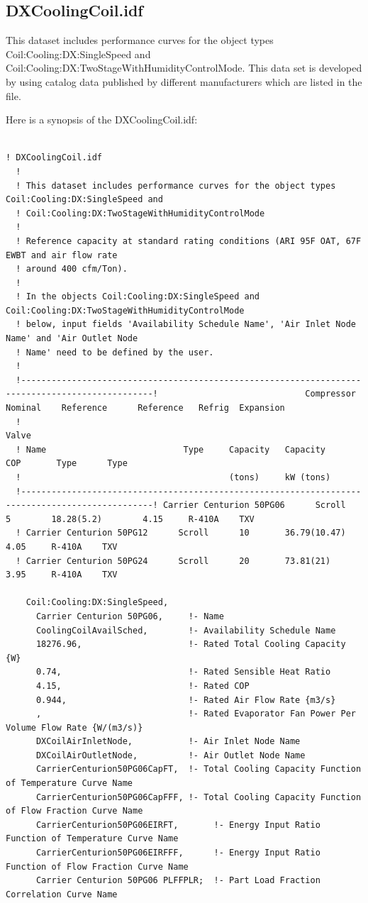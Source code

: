 \subsection{DXCoolingCoil.idf}\label{dxcoolingcoil.idf}

This dataset includes performance curves for the object types Coil:Cooling:DX:SingleSpeed and Coil:Cooling:DX:TwoStageWithHumidityControlMode. This data set is developed by using catalog data published by different manufacturers which are listed in the file.

Here is a synopsis of the DXCoolingCoil.idf:

\begin{lstlisting}

! DXCoolingCoil.idf
  !
  ! This dataset includes performance curves for the object types Coil:Cooling:DX:SingleSpeed and
  ! Coil:Cooling:DX:TwoStageWithHumidityControlMode
  !
  ! Reference capacity at standard rating conditions (ARI 95F OAT, 67F EWBT and air flow rate
  ! around 400 cfm/Ton).
  !
  ! In the objects Coil:Cooling:DX:SingleSpeed and Coil:Cooling:DX:TwoStageWithHumidityControlMode
  ! below, input fields 'Availability Schedule Name', 'Air Inlet Node Name' and 'Air Outlet Node
  ! Name' need to be defined by the user.
  !
  !------------------------------------------------------------------------------------------------!                             Compressor  Nominal    Reference      Reference   Refrig  Expansion
  !                                                                                         Valve
  ! Name                           Type     Capacity   Capacity          COP       Type      Type
  !                                         (tons)     kW (tons)
  !------------------------------------------------------------------------------------------------! Carrier Centurion 50PG06      Scroll      5        18.28(5.2)        4.15     R-410A    TXV
  ! Carrier Centurion 50PG12      Scroll      10       36.79(10.47)      4.05     R-410A    TXV
  ! Carrier Centurion 50PG24      Scroll      20       73.81(21)         3.95     R-410A    TXV

    Coil:Cooling:DX:SingleSpeed,
      Carrier Centurion 50PG06,     !- Name
      CoolingCoilAvailSched,        !- Availability Schedule Name
      18276.96,                     !- Rated Total Cooling Capacity {W}
      0.74,                         !- Rated Sensible Heat Ratio
      4.15,                         !- Rated COP
      0.944,                        !- Rated Air Flow Rate {m3/s}
      ,                             !- Rated Evaporator Fan Power Per Volume Flow Rate {W/(m3/s)}
      DXCoilAirInletNode,           !- Air Inlet Node Name
      DXCoilAirOutletNode,          !- Air Outlet Node Name
      CarrierCenturion50PG06CapFT,  !- Total Cooling Capacity Function of Temperature Curve Name
      CarrierCenturion50PG06CapFFF, !- Total Cooling Capacity Function of Flow Fraction Curve Name
      CarrierCenturion50PG06EIRFT,       !- Energy Input Ratio Function of Temperature Curve Name
      CarrierCenturion50PG06EIRFFF,      !- Energy Input Ratio Function of Flow Fraction Curve Name
      Carrier Centurion 50PG06 PLFFPLR;  !- Part Load Fraction Correlation Curve Name


\end{lstlisting}
